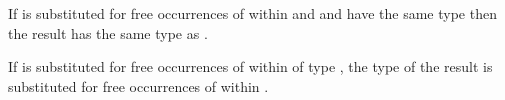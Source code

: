 If \first{\varexph} is substituted for free occurrences of \first{\varvarh} within \second{\varexph} and \first{\varexph} and \first{\varvarh} have the same type then the result has the same type as \second{\varexph}.



If \first{\vartyh} is substituted for free occurrences of \first{\tyvarh} within \first{\varexph} of type \second{\vartyh}, the type of the result is \first{\vartyh} substituted for free occurrences of \tyvarh within \second{\vartyh}.





